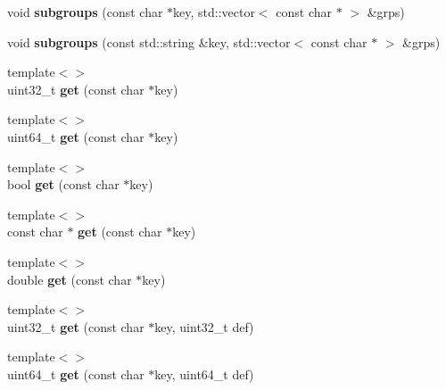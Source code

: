 \begin{DoxyCompactItemize}
\item 
\hypertarget{classConfig_a27543c26c56e81e436ed3d3b533f4b6e}{void {\bfseries subgroups} (const char $\ast$key, std\-::vector$<$ const char $\ast$ $>$ \&grps)}\label{classConfig_a27543c26c56e81e436ed3d3b533f4b6e}

\item 
\hypertarget{classConfig_a3950588dcea9c919e7f6d58c4904514d}{void {\bfseries subgroups} (const std\-::string \&key, std\-::vector$<$ const char $\ast$ $>$ \&grps)}\label{classConfig_a3950588dcea9c919e7f6d58c4904514d}

\item 
\hypertarget{classConfig_a89ec1c95c45bfd3eedca3eb47d7e6b66}{{\footnotesize template$<$$>$ }\\uint32\-\_\-t {\bfseries get} (const char $\ast$key)}\label{classConfig_a89ec1c95c45bfd3eedca3eb47d7e6b66}

\item 
\hypertarget{classConfig_a83e49ae726af6b833f6d655471980426}{{\footnotesize template$<$$>$ }\\uint64\-\_\-t {\bfseries get} (const char $\ast$key)}\label{classConfig_a83e49ae726af6b833f6d655471980426}

\item 
\hypertarget{classConfig_a35b80ae4143a735dbb8cd979e31d9f30}{{\footnotesize template$<$$>$ }\\bool {\bfseries get} (const char $\ast$key)}\label{classConfig_a35b80ae4143a735dbb8cd979e31d9f30}

\item 
\hypertarget{classConfig_a868b65b13b4d843b22126a73e0d119b4}{{\footnotesize template$<$$>$ }\\const char $\ast$ {\bfseries get} (const char $\ast$key)}\label{classConfig_a868b65b13b4d843b22126a73e0d119b4}

\item 
\hypertarget{classConfig_a9fb644c76122da00f0396cca69fdb854}{{\footnotesize template$<$$>$ }\\double {\bfseries get} (const char $\ast$key)}\label{classConfig_a9fb644c76122da00f0396cca69fdb854}

\item 
\hypertarget{classConfig_a01503b0fe03e702ac42cc71025496cc7}{{\footnotesize template$<$$>$ }\\uint32\-\_\-t {\bfseries get} (const char $\ast$key, uint32\-\_\-t def)}\label{classConfig_a01503b0fe03e702ac42cc71025496cc7}

\item 
\hypertarget{classConfig_ab7c8f41f1f68386d5c5aa220b04a6395}{{\footnotesize template$<$$>$ }\\uint64\-\_\-t {\bfseries get} (const char $\ast$key, uint64\-\_\-t def)}\label{classConfig_ab7c8f41f1f68386d5c5aa220b04a6395}


\end{DoxyCompactItemize}
